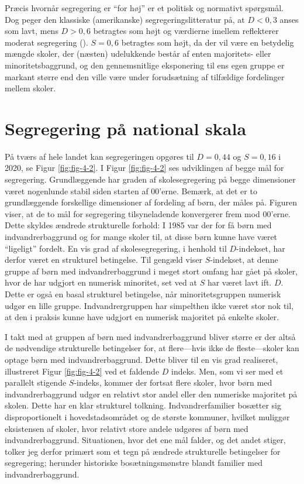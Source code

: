\documentclass[
]{book}
\begin{document}
Præcis hvornår segregering er ``for høj'' er et politisk og normativt spørgsmål. Dog peger den klassiske (amerikanske) segregeringslitteratur på, at \(D<0,3\) anses som lavt, mens \(D>0,6\) betragtes som højt og værdierne imellem reflekterer moderat segregering (). \(S=0,6\) betragtes som højt, da der vil være en betydelig mængde skoler, der (næsten) udelukkende består af enten majoritets- eller minoritetsbaggrund, og den gennemsnitlige eksponering til ens egen gruppe er markant større end den ville være under forudsætning af tilfældige fordelinger mellem skoler.

\section{Segregering på national skala}\label{segregering-puxe5-national-skala}

På tværs af hele landet kan segregeringen opgøres til \(D = 0,44\) og \(S = 0,16\) i 2020, se Figur \ref{fig:fig-4-2}. I Figur \ref{fig:fig-4-2} ses udviklingen af begge mål for segregering. Grundlæggende har graden af skolesegregering på begge dimensioner været nogenlunde stabil siden starten af 00'erne. Bemærk, at det er to grundlæggende forskellige dimensioner af fordeling af børn, der måles på. Figuren viser, at de to mål for segregering tilsyneladende konvergerer frem mod 00'erne. Dette skyldes ændrede strukturelle forhold: I 1985 var der for få børn med indvandrerbaggrund og for mange skoler til, at disse børn kunne have været ``ligeligt'' fordelt. En vis grad af skolesegregering, i henhold til \(D\)-indekset, har derfor været en strukturel betingelse. Til gengæld viser \(S\)-indekset, at denne gruppe af børn med indvandrerbaggrund i meget stort omfang har gået på skoler, hvor de har udgjort en numerisk minoritet, set ved at \(S\) har været lavt ift. \(D\). Dette er også en basal strukturel betingelse, når minoritetsgruppen numerisk udgør en lille gruppe. Indvandrergruppen har simpelthen ikke været stor nok til, at den i praksis kunne have udgjort en numerisk majoritet på enkelte skoler.

I takt med at gruppen af børn med indvandrerbaggrund bliver større er der altså de nødvendige strukturelle betingelser for, at flere---hvis ikke de fleste---skoler kan optage børn med indvandrerbaggrund. Dette bliver til en vis grad realiseret, illustreret Figur \ref{fig:fig-4-2} ved et faldende \(D\) indeks. Men, som vi ser med et parallelt stigende \(S\)-indeks, kommer der fortsat flere skoler, hvor børn med indvandrerbaggrund udgør en relativt stor andel eller den numeriske majoritet på skolen. Dette har en klar strukturel tolkning. Indvandrerfamilier bosætter sig disproportionelt i hovedstadsområdet og de største kommuner, hvilket muliggør eksistensen af skoler, hvor relativt store andele udgøres af børn med indvandrerbaggrund. Situationen, hvor det ene mål falder, og det andet stiger, tolker jeg derfor primært som et tegn på ændrede strukturelle betingelser for segregering; herunder historiske bosætningsmønstre blandt familier med indvandrerbaggrund.
\end{document}
